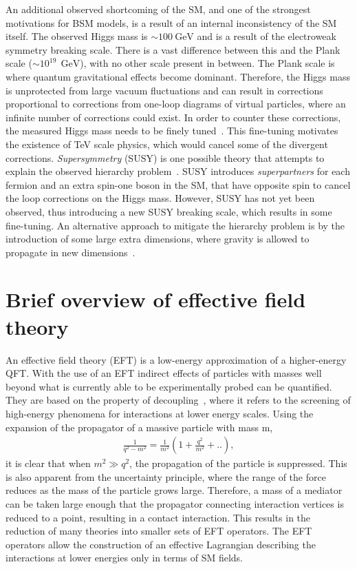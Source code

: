 An additional observed shortcoming of the SM, and one of the strongest motivations for BSM models, is a result of an internal inconsistency of the SM itself. The observed Higgs mass is $\sim \SI{100}{\giga\electronvolt}$ and is a result of the electroweak symmetry breaking scale. There is a vast difference between this and the Plank scale ($\sim 10^19~\SI{}{\giga\electronvolt}$), with no other scale present in between. The Plank scale is where quantum gravitational effects become dominant. Therefore, the Higgs mass is unprotected from large vacuum fluctuations and can result in corrections proportional to corrections from one-loop diagrams of virtual particles, where an infinite number of corrections could exist. In order to counter these corrections, the measured Higgs mass needs to be finely tuned~\cite{Giudice_2008}. This fine-tuning motivates the existence of TeV scale physics, which would cancel some of the divergent corrections. \emph{Supersymmetry} (SUSY) is one possible theory that attempts to explain the observed hierarchy problem~\cite{MARTIN_1998}. SUSY introduces \emph{superpartners} for each fermion and an extra spin-one boson in the SM, that have opposite spin to cancel the loop corrections on the Higgs mass. However, SUSY has not yet been observed, thus introducing a new SUSY breaking scale, which results in some fine-tuning. An alternative approach to mitigate the hierarchy problem is by the introduction of some large extra dimensions, where gravity is allowed to propagate in new dimensions~\cite{Arkani_Hamed_1998}. 

\section{Brief overview of effective field theory}
An effective field theory (EFT) is a low-energy approximation of a higher-energy QFT. With the use of an EFT indirect effects of particles with masses well beyond what is currently able to be experimentally probed can be quantified. They are based on the property of decoupling~\cite{manohar2018introduction}, where it refers to the screening of high-energy phenomena for interactions at lower energy scales. Using the expansion of the propagator of a massive particle with mass m, 
\begin{equation}
    \label{eq:propogator}
    \begin{aligned}
        \frac{1}{q^2 - m^2} = \frac{1}{m^2}(1 + \frac{q^2}{m^2} + ..),
     \end{aligned}
\end{equation}
it is clear that when $m^2 \gg q^2$, the propagation of the particle is suppressed. This is also apparent from the uncertainty principle, where the range of the force reduces as the mass of the particle grows large. Therefore, a mass of a mediator can be taken large enough that the propagator connecting interaction vertices is reduced to a point, resulting in a contact interaction. This results in the reduction of many theories into smaller sets of EFT operators. The EFT operators allow the construction of an effective Lagrangian describing the interactions at lower energies only in terms of SM fields. 

